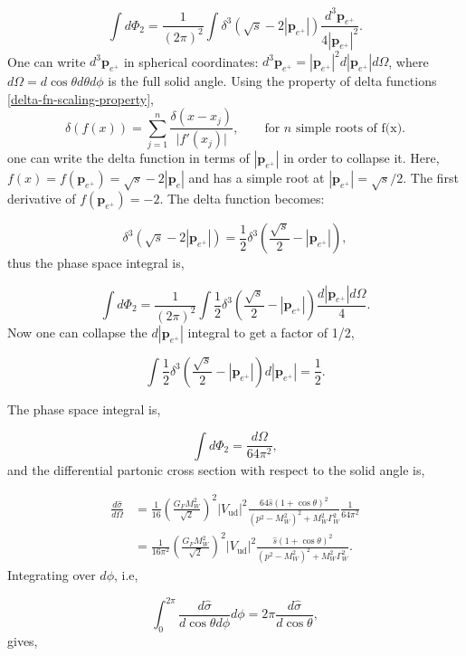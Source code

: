 \documentclass[a4paper,11pt]{article}
\begin{document}
$$
\int d\Phi_2 = \frac{1}{(2\pi)^2} \int \delta^3(\sqrt{s}- 2|\boldsymbol{p}_{e^+}|)  \frac{d^3\boldsymbol{p}_{e^+}}{4|\boldsymbol{p}_{e^+}|^2}.
$$
One can write $d^3\boldsymbol{p}_{e^+}$ in spherical coordinates: $d^3\boldsymbol{p}_{e^+} = |\boldsymbol{p}_{e^+}|^2 d|\boldsymbol{p}_{e^+}| d\Omega$, where $d\Omega = d\cos\theta d\theta d\phi$ is the full solid angle. Using the property of delta functions \ref{delta-fn-scaling-property}, 
$$
\delta(f(x))
=
\sum_{j=1}^{n}
\frac{\delta(x-x_j)}{\bigl| f'(x_j) \bigr|},
\qquad
\text{for $n$ simple roots of f(x)}.
$$
one can write the delta function in terms of $|\boldsymbol{p}_{e^+}|$ in order to collapse it. Here, $f(x) = f(\boldsymbol{p}_{e^+}) = \sqrt{s} - 2|\boldsymbol{p}_e|$ and has a simple root at $|\boldsymbol{p}_{e^+}| = \sqrt{s}/2. $ The first derivative of $f(\boldsymbol{p}_{e^+}) = -2$. The delta function becomes:

$$
\delta^3(\sqrt{s}- 2|\boldsymbol{p}_{e^+}|) = \frac{1}{2}\delta^3\left(\frac{\sqrt{s}}{2}- |\boldsymbol{p}_{e^+}|\right),
$$
thus the phase space integral is,

$$
\int d\Phi_2 = \frac{1}{(2\pi)^2} \int  \frac{1}{2}\delta^3\left(\frac{\sqrt{s}}{2}- |\boldsymbol{p}_{e^+}|\right) \frac{d|\boldsymbol{p}_{e^+}| d\Omega}{4}.
$$
Now one can collapse the $d|\boldsymbol{p}_{e^+}|$ integral to get a factor of 1/2,

$$\int \frac{1}{2} \delta^3\left(\frac{\sqrt{s}}{2}- |\boldsymbol{p}_{e^+}|\right) d|\boldsymbol{p}_{e^+}| = \frac{1}{2}. $$

The phase space integral is,

$$ 
\int d\Phi_2 = \frac{d\Omega}{64\pi^2},
$$
and the differential partonic cross section with respect to the solid angle is,




\begin{equation*}
	\begin{aligned}
	 \frac{d\hat{\sigma}}{d\Omega} &= \frac{1}{16}\left(\frac{G_FM_W^2}{\sqrt{2}}\right)^2|V_\text{ud}|^2 \frac{64\hat{s}(1+ \cos\theta)^2}{(p^2-M_W^2)^2 +M_W^2\Gamma_W^2}\frac{1}{64\pi^2}\\		
	 &= \frac{1}{16\pi^2}\left(\frac{G_FM_W^2}{\sqrt{2}}\right)^2|V_\text{ud}|^2 \frac{\hat{s}(1+ \cos\theta)^2}{(p^2-M_W^2)^2 +M_W^2\Gamma_W^2}.
	\end{aligned}
\end{equation*}
Integrating over $d\phi$, i.e,

$$\int_0^{2\pi} \frac{d\hat{\sigma}}{d\cos\theta d\phi}d\phi  = 2\pi  \frac{d\hat{\sigma}}{d\cos\theta}, $$
 gives,
\end{document}
